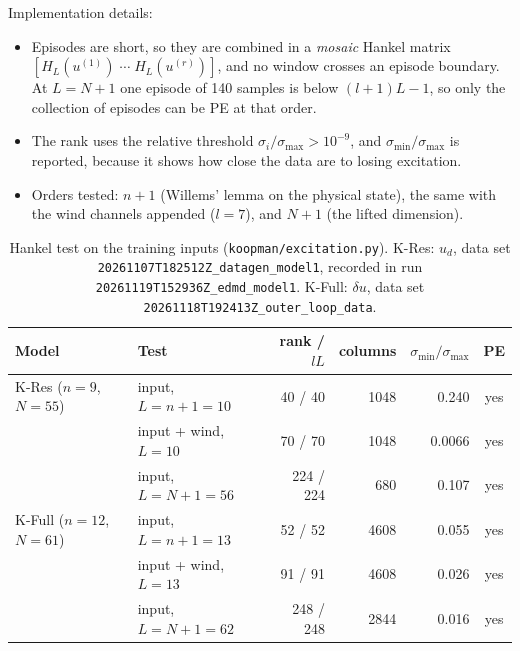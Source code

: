 \documentclass[11pt,a4paper]{article}
\newcommand{\KRes}{\textsf{K-Res}}            %
\newcommand{\KFull}{\textsf{K-Full}}          %
\begin{document}
	Implementation details:
	\begin{itemize}[leftmargin=*]
		\item Episodes are short, so they are combined in a \emph{mosaic} Hankel matrix
		$[H_L(u^{(1)})\; \cdots\; H_L(u^{(r)})]$, and no window crosses an episode boundary.
		At $L = N + 1$ one episode of 140 samples is below $(l+1)L - 1$, so only the collection of
		episodes can be PE at that order.
		\item The rank uses the relative threshold $\sigma_i/\sigma_{\max} > 10^{-9}$, and
		$\sigma_{\min}/\sigma_{\max}$ is reported, because it shows how close the data are to losing
		excitation.
		\item Orders tested: $n + 1$ (Willems' lemma on the physical state), the same with the wind
		channels appended ($l = 7$), and $N + 1$ (the lifted dimension).
	\end{itemize}

	\begin{table}[ht]
		\centering
		\caption{Hankel test on the training inputs (\texttt{koopman/excitation.py}).
			\KRes{}: $u_d$, data set \texttt{20261107T182512Z\_datagen\_model1}, recorded in run
			\texttt{20261119T152936Z\_edmd\_model1}.
			\KFull{}: $\delta u$, data set \texttt{20261118T192413Z\_outer\_loop\_data}.}
		\label{tab:pe}
		\small
		\begin{tabular}{@{}llrrrc@{}}
			\toprule
			Model & Test & rank / $lL$ & columns & $\sigma_{\min}/\sigma_{\max}$ & PE \\
			\midrule
			\KRes{} ($n = 9$, $N = 55$) & input, $L = n+1 = 10$ & 40 / 40 & 1048 & 0.240 & yes \\
			& input + wind, $L = 10$ & 70 / 70 & 1048 & 0.0066 & yes \\
			& input, $L = N+1 = 56$ & 224 / 224 & 680 & 0.107 & yes \\
			\midrule
			\KFull{} ($n = 12$, $N = 61$) & input, $L = n+1 = 13$ & 52 / 52 & 4608 & 0.055 & yes \\
			& input + wind, $L = 13$ & 91 / 91 & 4608 & 0.026 & yes \\
			& input, $L = N+1 = 62$ & 248 / 248 & 2844 & 0.016 & yes \\
			\bottomrule
		\end{tabular}
	\end{table}
\end{document}
